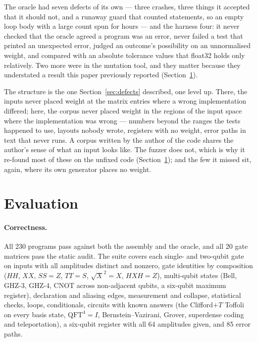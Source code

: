 \documentclass[11pt]{article}
\begin{document}
The oracle had seven defects of its own --- three crashes, three things it accepted that it
should not, and a runaway guard that counted statements, so an empty loop body with a large
count spun for hours --- and the harness four: it never checked that the oracle agreed a
program was an error, never failed a test that printed an unexpected error, judged an
outcome's possibility on an unnormalised weight, and compared with an absolute tolerance
values that float32 holds only relatively. Two more were in the mutation tool, and they
matter because they understated a result this paper previously reported
(Section~\ref{sec:eval}).

The structure is the one Section~\ref{sec:defects} described, one level up. There, the
inputs never placed weight at the matrix entries where a wrong implementation differed;
here, the corpus never placed weight in the regions of the input space where the
implementation was wrong --- numbers beyond the ranges the tests happened to use, layouts
nobody wrote, registers with no weight, error paths in text that never runs. A corpus
written by the author of the code shares the author's sense of what an input looks like.
The fuzzer does not, which is why it re-found most of these on the unfixed code
(Section~\ref{sec:eval}); and the few it missed sit, again, where its own generator places
no weight.

\section{Evaluation}
\label{sec:eval}

\paragraph{Correctness.} All 230 programs pass against both the assembly and the
oracle, and all 20 gate matrices pass the static audit. The suite covers each single- and two-qubit
gate on inputs with all amplitudes distinct and nonzero, gate identities by composition
($HH$, $XX$, $SS = Z$, $TT = S$, $\sqrt{X}^2 = X$, $HXH = Z$), multi-qubit states (Bell,
GHZ-3, GHZ-4, CNOT across non-adjacent qubits, a six-qubit maximum register), declaration
and aliasing edges, measurement and collapse, statistical checks, loops, conditionals,
circuits with known answers (the Clifford$+T$ Toffoli on every basis state,
$\mathrm{QFT}^4 = I$, Bernstein--Vazirani, Grover, superdense coding and teleportation),
a six-qubit register with all 64 amplitudes given, and 85 error paths.
\end{document}
